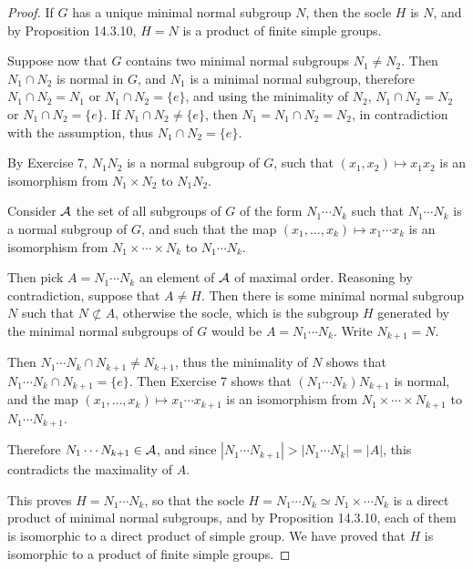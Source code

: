 \documentclass[11pt,a4paper]{article}
\begin{document}
 \begin{proof}
 If $G$ has a unique minimal normal subgroup $N$, then the socle $H$ is $N$, and by Proposition 14.3.10, $H = N$ is a product of finite simple groups.
  
 
 Suppose now that $G$ contains two minimal normal subgroups $N_1\ne N_2$.  Then $N_1 \cap N_2$ is normal in $G$, and $N_1$ is a minimal normal subgroup, therefore $N_1 \cap N_2 = N_1$ or $N_1 \cap N_2 = \{e\}$, and using the minimality of $N_2$, $N_1 \cap N_2 = N_2$ or $N_1 \cap N_2 = \{e\}$. If $N_1 \cap N_2 \ne \{e\}$, then $N_1 = N_1 \cap N_2 = N_2$, in contradiction with the assumption, thus $N_1 \cap N_2 = \{e\}$.
 
 By Exercise 7, $N_1N_2$ is a normal subgroup of $G$, such that $(x_1,x_2) \mapsto x_1x_2$ is an isomorphism from $N_1 \times N_2$ to $N_1N_2$.
 
Consider $\cal A$ the set of all subgroups of $G$ of the form $N_1 \cdots N_k$ such that $N_1\cdots N_k$ is a normal subgroup of $G$, and such that the map $(x_1,\ldots,x_k) \mapsto x_1\cdots x_k$ is an isomorphism from $N_1 \times \cdots \times N_k$ to $N_1\cdots N_k$.
 
Then pick $A =N_1 \cdots N_k$ an element of $\cal A$ of maximal order. Reasoning by contradiction, suppose that $A \ne H$. Then there is some minimal normal subgroup $N$ such that $N\not \subset A$, otherwise the socle, which is the subgroup $H$ generated by the minimal normal subgroups of $G$ would be $A = N_1\cdots N_k$. Write $N_{k+1} = N$.

Then $N_1\cdots N_k \cap N_{k+1} \ne N_{k+1}$, thus the minimality of $N$ shows that $N_1\cdots N_k \cap N_{k+1} = \{e\}$. Then Exercise 7 shows that $(N_1\cdots N_k)N_{k+1}$ is normal, and the map $(x_1,\ldots,x_k) \mapsto x_1\cdots x_{k+1}$ is an isomorphism from $N_1 \times \cdots \times N_{k+1}$ to $N_1\cdots N_{k+1}$.

Therefore $N_1\cdots N_{k+1} \in {\cal A}$, and since $|N_1\cdots N_{k+1}|> |N_1\cdots N_{k}| = |A|$, this contradicts the maximality of $A$.

This proves $H = N_1\cdots N_k$, so that the socle $ H =N_1\cdots N_k \simeq N_1 \times \cdots N_k$ is a direct product of minimal normal subgroups, and by Proposition 14.3.10, each of them is isomorphic to a direct product of simple group. We have proved that $H$ is isomorphic to a product of finite simple groups.

 \end{proof}
 
\end{document}
